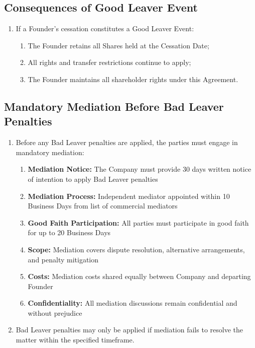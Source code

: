 \subsection{Consequences of Good Leaver Event}
\begin{enumerate}[label=(\alph*)]
\item If a Founder's cessation constitutes a Good Leaver Event:
    \begin{enumerate}[label=(\roman*)]
    \item The Founder retains all Shares held at the Cessation Date;
    \item All rights and transfer restrictions continue to apply;
    \item The Founder maintains all shareholder rights under this Agreement.
    \end{enumerate}
\end{enumerate}

\subsection{Mandatory Mediation Before Bad Leaver Penalties}
\begin{enumerate}[label=(\alph*)]
\item Before any Bad Leaver penalties are applied, the parties must engage in mandatory mediation:
    \begin{enumerate}[label=(\roman*)]
    \item \textbf{Mediation Notice:} The Company must provide 30 days written notice of intention to apply Bad Leaver penalties
    \item \textbf{Mediation Process:} Independent mediator appointed within 10 Business Days from list of commercial mediators
    \item \textbf{Good Faith Participation:} All parties must participate in good faith for up to 20 Business Days
    \item \textbf{Scope:} Mediation covers dispute resolution, alternative arrangements, and penalty mitigation
    \item \textbf{Costs:} Mediation costs shared equally between Company and departing Founder
    \item \textbf{Confidentiality:} All mediation discussions remain confidential and without prejudice
    \end{enumerate}
\item Bad Leaver penalties may only be applied if mediation fails to resolve the matter within the specified timeframe.
\end{enumerate}

